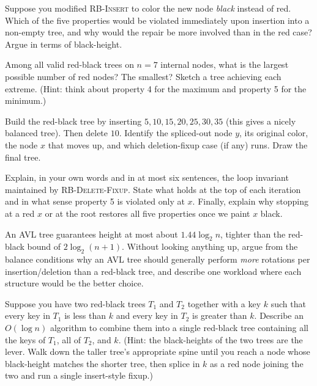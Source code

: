 \begin{exercise}\label{ch13:ex-why-red}
Suppose you modified \textsc{RB-Insert} to color the new node \emph{black} instead
of red. Which of the five properties would be violated immediately upon insertion
into a non-empty tree, and why would the repair be more involved than in the red
case? Argue in terms of black-height.
\end{exercise}

\begin{exercise}\label{ch13:ex-red-count}
Among all valid red-black trees on $n = 7$ internal nodes, what is the largest
possible number of red nodes? The smallest? Sketch a tree achieving each extreme.
(Hint: think about property 4 for the maximum and property 5 for the minimum.)
\end{exercise}

\begin{exercise}\label{ch13:ex-delete}
Build the red-black tree by inserting $5, 10, 15, 20, 25, 30, 35$ (this gives a
nicely balanced tree). Then delete $10$. Identify the spliced-out node $y$, its
original color, the node $x$ that moves up, and which deletion-fixup case (if any)
runs. Draw the final tree.
\end{exercise}

\begin{exercise}\label{ch13:ex-extra-black}
Explain, in your own words and in at most six sentences, the loop invariant
maintained by \textsc{RB-Delete-Fixup}. State what holds at the top of each
iteration and in what sense property 5 is violated only at $x$. Finally, explain
why stopping at a red $x$ or at the root restores all five properties once we
paint $x$ black.
\end{exercise}

\begin{exercise}\label{ch13:ex-avl}
An AVL tree guarantees height at most about $1.44\log_2 n$, tighter than the
red-black bound of $2\log_2(n+1)$. Without looking anything up, argue from the
balance conditions why an AVL tree should generally perform \emph{more} rotations
per insertion/deletion than a red-black tree, and describe one workload where each
structure would be the better choice.
\end{exercise}

\begin{exercise}\label{ch13:ex-join}
Suppose you have two red-black trees $T_1$ and $T_2$ together with a key $k$ such
that every key in $T_1$ is less than $k$ and every key in $T_2$ is greater than
$k$. Describe an $O(\log n)$ algorithm to combine them into a single red-black tree
containing all the keys of $T_1$, all of $T_2$, and $k$. (Hint: the black-heights
of the two trees are the lever. Walk down the taller tree's appropriate spine until
you reach a node whose black-height matches the shorter tree, then splice in $k$ as
a red node joining the two and run a single insert-style fixup.)
\end{exercise}
